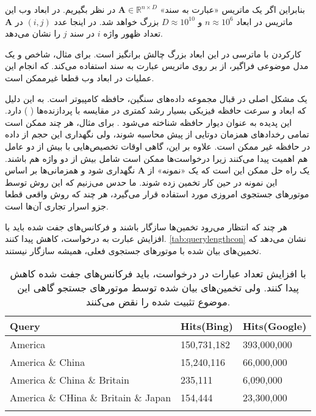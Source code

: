 بنابراین اگر یک ماتریس «عبارت به سند» 
$\mathbf{A} \in \mathbb{R}^{n \times D}$
در نظر بگیریم. در ابعاد وب این ماتریس در ابعاد 
$n \approx 10^6$
و 
$D \approx 10^10$
بزرگ خواهد شد.
در اینجا عدد 
$(i,j)$
در 
$\mathbf{A}$
تعداد ظهور واژه 
$i$
در سند 
$j$
را نشان می‌دهد.

کارکردن با ماترسی در این ابعاد بزرگ چالش برانگیز است. برای مثال، شاخص 
%
\cite{litez58}
و یک مدل موضوعی فراگیر، از 
%
بر روی ماتریس عبارت به سند استفاده می‌کند. که انجام این عملیات در ابعاد وب قطعا غیرممکن است.

یک مشکل اصلی در قبال مجموعه داده‌های سنگین، حافظه کامپیوتر است. به این دلیل که ابعاد و سرعت حافظه فیزیکی بسیار رشد کمتری در مقایسه با پردازنده‌ها (
) دارد. این پدیده به عنوان دیوار حافظه شناخته می‌شود
\cite{litez139, litez168}
. برای مثال،‌ هر چند ممکن است تمامی رخداد‌های همزمان دوتایی از پیش محاسبه شوند، ولی نگهداری این حجم از داده در حافظه غیر ممکن است. علاوه بر این، گاهی اوقات تخصیص‌‌هایی با بیش از دو عامل هم اهمیت پیدا می‌کنند زیرا درخواست‌ها ممکن است شامل بیش از دو واژه هم باشند. یک راه حل ممکن این است که یک «نمونه» از 
$\mathbf{A}$
 نگهداری شود و همزمانی‌ها بر اساس این نمونه در حین کار تخمین زده شوند. ما حدس می‌زنیم که این روش توسط موتورهای جستجوی امروزی مورد استفاده قرار می‌گیرد، هر چند که روش واقعی قطعا جزو اسرار تجاری آن‌ها است.

هر چند که انتظار می‌رود تخمین‌ها سازگار باشند و فرکانس‌های جفت شده باید با افزایش عبارت به درخواست، کاهش پیدا کنند. 
\autoref{tab:querylengthcon}
نشان می‌دهد که تخمین‌های بیان شده با موتورهای جستجوی فعلی، همیشه سازگار نیستند.
\begin{table}[h]
\caption{
با افزایش تعداد عبارات در درخواست، باید فرکانس‌های جفت شده کاهش پیدا کنند. ولی تخمین‌های بیان شده توسط موتورهای جستجو گاهی این موضوع تثبیت شده را نقض می‌کنند.
}
\centering
\bigskip
\begin{latin}
\begin{tabular}{lll}
\hhline{===}
Query        				& Hits(Bing)    & Hits(Google) 	\\ \hline
America            			& 150,731,182 	& 393,000,000 	\\
America \& China          		& 15,240,116  	& 66,000,000 	\\
America \& China \& Britain     	& 235,111     	& 6,090,000     \\
America \& CHina \& Britain \& Japan 	& 154,444     	& 23,300,000    \\
\hhline{===}
\end{tabular}
\end{latin}
\label{tab:querylengthcon}
\end{table}

